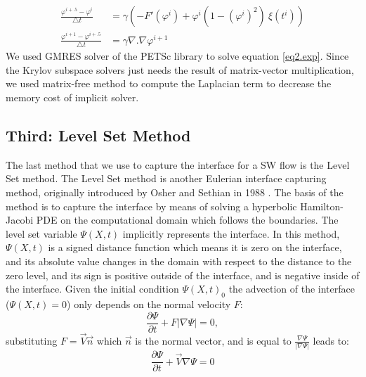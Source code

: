 \documentclass[letterpaper,10pt]{article}
\begin{document}
\begin{align}
\frac{\varphi^{i+.5}-\varphi^i}{\bigtriangleup t}&= \gamma (-F'(\varphi^i)+\varphi^i (1-(\varphi^i)^2)\ \xi(t^i)) \label{eq1.exp}\\
\frac{\varphi^{i+1}-\varphi^{i+.5}}{\bigtriangleup t} &= \gamma \nabla .\nabla \varphi^{i+1} \label{eq2.exp}
\end{align}
We used GMRES solver of the PETSc \cite{petsc-user-ref} library to solve equation \eqref{eq2.exp}. Since the Krylov subspace solvers just needs the result of matrix-vector multiplication, we used matrix-free method to compute the Laplacian term to decrease the memory cost of implicit solver.
\subsection{Third: Level Set Method} \label{level set}
The last method that we use to capture the interface for a SW flow is the Level Set method.
The Level Set method is another Eulerian interface capturing method, originally introduced by Osher and Sethian in 1988 \cite{Osher1988}.
The basis of the method is to capture the interface by means of solving a hyperbolic Hamilton-Jacobi PDE on 
the computational domain which follows the boundaries. The level set variable $\varPsi (X,t)$ implicitly represents the interface. In this method, $\varPsi (X,t)$ is a signed distance function which means it is zero on the interface, and its absolute value changes in the domain with respect to the distance to the zero level, and its sign is positive outside of the interface, and is negative inside of the interface. 
Given the initial condition $\varPsi (X,t)_0$ the advection of the interface ($\varPsi (X,t)=0$) only depends on the normal velocity $F$:
\begin{equation}\label{levelseteq1}
        \frac{\partial \varPsi}{\partial t} + F |\nabla \varPsi| = 0,
\end{equation}
substituting $F = \overrightarrow{V} \overrightarrow{n} $ which  $\overrightarrow{n} $ is the normal vector, and is equal to
$ \frac{\nabla \varPsi}{|\nabla \varPsi|}$ leads to:
\begin{equation}\label{levelseteq2}
        \frac{\partial \varPsi}{\partial t} + \overrightarrow{V} \nabla \varPsi = 0
\end{equation}
\end{document}
